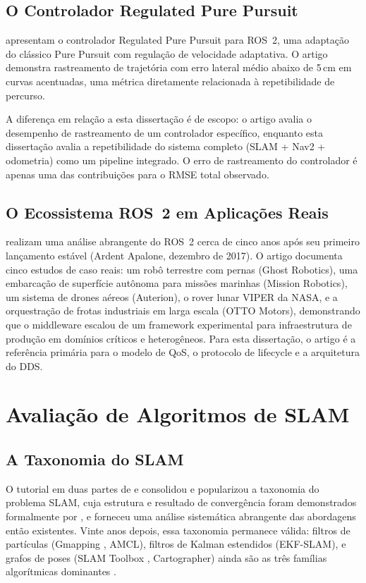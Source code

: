 \subsection{O Controlador Regulated Pure Pursuit}

 apresentam o controlador Regulated Pure Pursuit para
ROS~2, uma adaptação do clássico Pure Pursuit \cite{coulter1992} com regulação
de velocidade adaptativa. O artigo demonstra rastreamento de trajetória com
erro lateral médio abaixo de 5\,cm em curvas acentuadas, uma métrica diretamente
relacionada à repetibilidade de percurso.

A diferença em relação a esta dissertação é de escopo: o artigo avalia o desempenho
de rastreamento de um controlador específico, enquanto esta dissertação avalia a
repetibilidade do sistema completo (SLAM + Nav2 + odometria) como um pipeline
integrado. O erro de rastreamento do controlador é apenas uma das contribuições
para o RMSE total observado.

\subsection{O Ecossistema ROS~2 em Aplicações Reais}

 realizam uma análise abrangente do ROS~2 cerca de
cinco anos após seu primeiro lançamento estável (Ardent Apalone, dezembro de 2017).
O artigo documenta cinco estudos de caso reais: um robô terrestre com pernas
(Ghost Robotics), uma embarcação de superfície autônoma para missões marinhas
(Mission Robotics), um sistema de drones aéreos (Auterion), o rover lunar VIPER
da NASA, e a orquestração de frotas industriais em larga escala (OTTO Motors),
demonstrando que o middleware escalou de um framework experimental para
infraestrutura de produção em domínios críticos e heterogêneos. Para esta
dissertação, o artigo é a referência primária para o modelo de QoS, o protocolo
de lifecycle e a arquitetura do DDS.

\section{Avaliação de Algoritmos de SLAM}
\label{sec:rel_slam}

\subsection{A Taxonomia do SLAM}

O tutorial em duas partes de  e 
consolidou e popularizou a taxonomia do problema SLAM, cuja estrutura e
resultado de convergência foram demonstrados formalmente por ,
e forneceu uma análise sistemática abrangente das abordagens
então existentes. Vinte anos depois, essa taxonomia permanece válida: filtros
de partículas (Gmapping \cite{grisetti2007}, AMCL), filtros de Kalman estendidos (EKF-SLAM), e grafos
de poses (SLAM Toolbox \cite{macenski2021slam}, Cartographer) ainda são as três famílias algorítmicas
dominantes \cite{thrun2005}.

